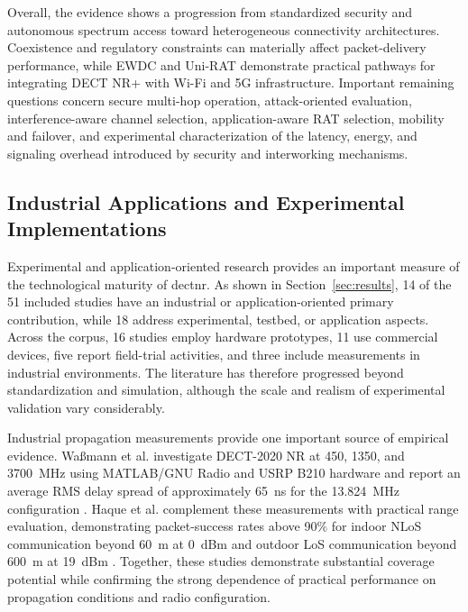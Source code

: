 Overall, the evidence shows a progression from standardized security and
autonomous spectrum access toward heterogeneous connectivity architectures.
Coexistence and regulatory constraints can materially affect packet-delivery
performance, while EWDC and Uni-RAT demonstrate practical pathways for
integrating DECT NR+ with Wi-Fi and 5G infrastructure. Important remaining
questions concern secure multi-hop operation, attack-oriented evaluation,
interference-aware channel selection, application-aware RAT selection,
mobility and failover, and experimental characterization of the latency,
energy, and signaling overhead introduced by security and interworking
mechanisms.


\subsection{Industrial Applications and Experimental Implementations}
\label{subsec:industrial_experimental}

Experimental and application-oriented research provides an important measure
of the technological maturity of \gls{dectnr}. As shown in
Section~\ref{sec:results}, 14 of the 51 included studies have an industrial or
application-oriented primary contribution, while 18 address experimental,
testbed, or application aspects. Across the corpus, 16 studies employ hardware
prototypes, 11 use commercial devices, five report field-trial activities, and
three include measurements in industrial environments. The literature has
therefore progressed beyond standardization and simulation, although the scale
and realism of experimental validation vary considerably.

Industrial propagation measurements provide one important source of empirical
evidence. Wa{\ss}mann et al. investigate DECT-2020 NR at 450, 1350, and
3700~MHz using MATLAB/GNU Radio and USRP B210 hardware and report an average
RMS delay spread of approximately 65~ns for the 13.824~MHz configuration
\cite{wassmannPerformanceDECT2020NR2024}. Haque et al. complement these
measurements with practical range evaluation, demonstrating packet-success
rates above 90\% for indoor NLoS communication beyond 60~m at 0~dBm and
outdoor LoS communication beyond 600~m at 19~dBm
\cite{haqueDECT2020NRLink2025}. Together, these studies demonstrate substantial
coverage potential while confirming the strong dependence of practical
performance on propagation conditions and radio configuration.

